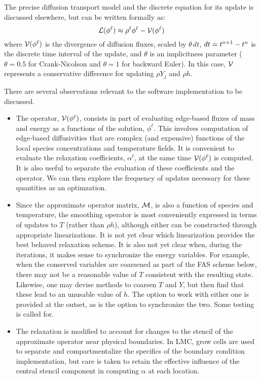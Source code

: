 \documentclass[11pt]{article}
\begin{document}
The precise diffusion transport model and the discrete equation for
its update is discussed elsewhere, but can be written formally as:
\[
  {\cal L}({\phi}^{\ell}) \approx {\rho}^{\ell} {\phi}^{\ell} - {\cal V}({\phi}^{\ell})
\]
where ${\cal V}({\phi}^{\ell})$ is the divergence of diffusion fluxes,
scaled by $\theta \, dt$, $dt = {t^{n+1}} - {t^{n}}$ is the discrete time
interval of the update, and $\theta$ is an implicitness parameter
($\theta = 0.5$ for Crank-Nicolson and $\theta=1$ for backward Euler).
In this case, ${\cal V}$ represents a conservative difference for
updating $\rho Y_{j}$ and $\rho h$.

There are several observations relevant to the software implementation to be discussed.
\begin{itemize}
\item The operator, ${\cal V}({\phi}^{\ell})$, consists in part of
  evaluating edge-based fluxes of mass and energy as a functions of
  the solution, ${\phi}^{\ell}$.  This involves computation of
  edge-based diffusivities that are complex (and expensive) functions
  of the local species concentrations and temperature fields.  It is
  convenient to evaluate the relaxation coefficients,
  ${\alpha}^{\ell}$, at the same time ${\cal V}({\phi}^{\ell})$ is
  computed.  It is also useful to separate the evaluation of these
  coefficients and the operator.  We can then explore the frequency of
  updates necessary for these quantities as an optimzation.
\item Since the approximate operator matrix, ${\cal M}$, is also a
  function of species and temperature, the smoothing operator is most
  conveniently expressed in terms of updates to $T$ (rather than
  $\rho h$), although either can be constructed through appropriate
  linearizations.  It is not yet clear which linearization provides
  the best behaved relaxation scheme.  It is also not yet clear when,
  during the iterations, it makes sense to synchronize the energy
  variables.  For example, when the conserved variables are coarsened
  as part of the FAS scheme below, there may not be a reasonable value
  of $T$ consistent with the resulting state.  Likewise, one may
  devise methods to coarsen $T$ and $Y$, but then find that these lead
  to an unusable value of $h$.  The option to work with either one is
  provided at the outset, as is the option to synchronize the two.
  Some testing is called for.
\item The relaxation is modified to account for changes to the stencil
  of the approximate operator near physical boundaries.  In LMC, grow
  cells are used to separate and compartmentalize the specifics of the
  boundary condition implementation, but care is taken to retain the
  effective influence of the central stencil component in computing
  $\alpha$ at each location.
\end{itemize}
\end{document}

